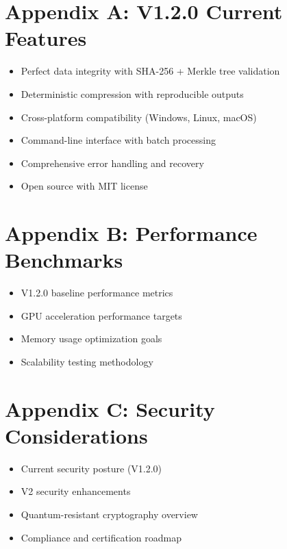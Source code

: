 \documentclass[12pt,a4paper]{article}
\begin{document}
\appendix

\section{Appendix A: V1.2.0 Current Features}
\begin{itemize}
    \item Perfect data integrity with SHA-256 + Merkle tree validation
    \item Deterministic compression with reproducible outputs
    \item Cross-platform compatibility (Windows, Linux, macOS)
    \item Command-line interface with batch processing
    \item Comprehensive error handling and recovery
    \item Open source with MIT license
\end{itemize}

\section{Appendix B: Performance Benchmarks}
\begin{itemize}
    \item V1.2.0 baseline performance metrics
    \item GPU acceleration performance targets
    \item Memory usage optimization goals
    \item Scalability testing methodology
\end{itemize}

\section{Appendix C: Security Considerations}
\begin{itemize}
    \item Current security posture (V1.2.0)
    \item V2 security enhancements
    \item Quantum-resistant cryptography overview
    \item Compliance and certification roadmap
\end{itemize}
\end{document}
